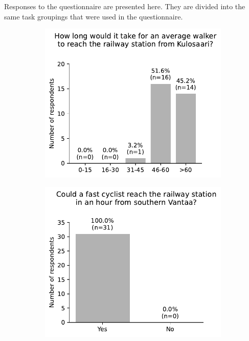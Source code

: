 \begin{appendices}
Responses to the questionnaire are presented here.
They are divided into the same task groupings that were used in the questionnaire.

\begin{figure}[H]
	\begin{subfigure}[b]{0.5\textwidth}
		\includegraphics[width=\textwidth]{visual/figures/survey/0.pdf}
	\end{subfigure}%
	\hfill
	\begin{subfigure}[b]{0.5\textwidth}
		\includegraphics[width=\textwidth]{visual/figures/survey/1.pdf}
	\end{subfigure}%
	\newline
\end{figure}


\end{appendices}
